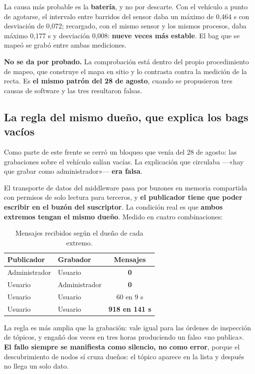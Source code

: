 \documentclass[12pt,letterpaper]{article}
\begin{document}
La causa más probable es la \textbf{batería}, y no por descarte. Con el vehículo a punto de agotarse, el intervalo entre barridos del sensor daba un máximo de 0,464 s con desviación de 0,072; recargado, con el mismo sensor y los mismos procesos, daba máximo 0,177 s y desviación 0,008: \textbf{nueve veces más estable}. El bag que se mapeó se grabó entre ambas mediciones.

\textbf{No se da por probado.} La comprobación está dentro del propio procedimiento de mapeo, que construye el mapa en sitio y lo contrasta contra la medición de la recta. Es \textbf{el mismo patrón del 28 de agosto}, cuando se propusieron tres causas de software y las tres resultaron falsas.

\subsection{La regla del mismo dueño, que explica los bags vacíos}

Como parte de este frente se cerró un bloqueo que venía del 28 de agosto: las grabaciones sobre el vehículo salían vacías. La explicación que circulaba ---«hay que grabar como administrador»--- \textbf{era falsa}.

El transporte de datos del middleware pasa por buzones en memoria compartida con permisos de solo lectura para terceros, y \textbf{el publicador tiene que poder escribir en el buzón del suscriptor}. La condición real es que \textbf{ambos extremos tengan el mismo dueño}. Medido en cuatro combinaciones:

\begin{table}[H]
    \centering
    \small
    \caption{Mensajes recibidos según el dueño de cada extremo.}
    \label{tab:dueno}
    \begin{tabular}{@{}llc@{}}
        \toprule
        \textbf{Publicador} & \textbf{Grabador} & \textbf{Mensajes} \\ \midrule
        Administrador & Usuario & \textbf{0} \\
        Usuario & Administrador & \textbf{0} \\
        Usuario & Usuario & 60 en 9 s \\
        Usuario & Usuario & \textbf{918 en 141 s} \\ \bottomrule
    \end{tabular}
\end{table}

La regla es más amplia que la grabación: vale igual para las órdenes de inspección de tópicos, y engañó dos veces en tres horas produciendo un falso «no publica». \textbf{El fallo siempre se manifiesta como silencio, no como error}, porque el descubrimiento de nodos sí cruza dueños: el tópico aparece en la lista y después no llega un solo dato.
\end{document}
